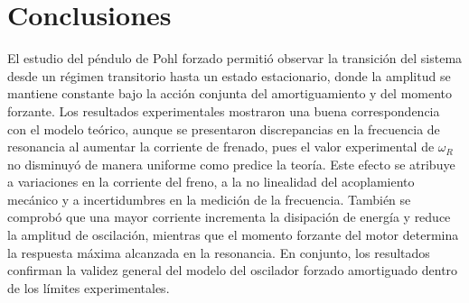 \section*{Conclusiones}
El estudio del p\'endulo de Pohl forzado permiti\'o observar la transici\'on del 
sistema desde un r\'egimen transitorio hasta un estado estacionario, donde la 
amplitud se mantiene constante bajo la acci\'on conjunta del amortiguamiento y 
del momento forzante. Los resultados experimentales mostraron una buena 
correspondencia con el modelo te\'orico, aunque se presentaron discrepancias en 
la frecuencia de resonancia al aumentar la corriente de frenado, pues el valor 
experimental de \(\omega_R\) no disminuy\'o de manera uniforme como predice la 
teor\'ia. Este efecto se atribuye a variaciones en la corriente del freno, a la 
no linealidad del acoplamiento mec\'anico y a incertidumbres en la medici\'on de 
la frecuencia. Tambi\'en se comprob\'o que una mayor corriente incrementa la 
disipaci\'on de energ\'ia y reduce la amplitud de oscilaci\'on, mientras que el 
momento forzante del motor determina la respuesta m\'axima alcanzada en la 
resonancia. En conjunto, los resultados confirman la validez general del modelo 
del oscilador forzado amortiguado dentro de los l\'imites experimentales.
